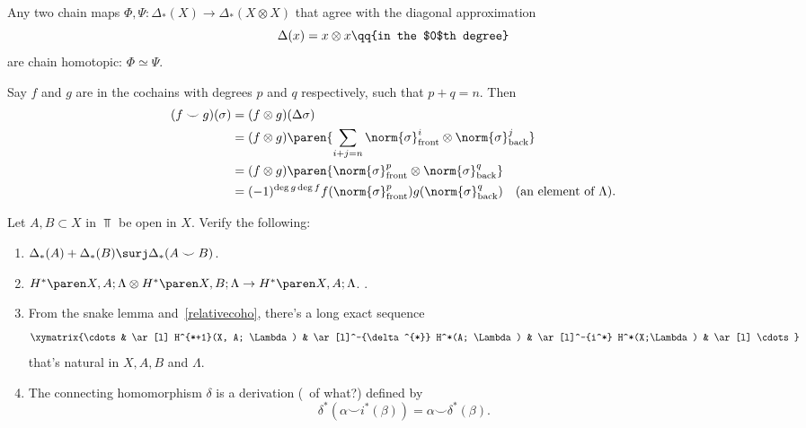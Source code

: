 \begin{todo}
    Any two chain maps $\Phi, \Psi \colon \Delta_*(X) \to \Delta_*(X\otimes X)$ that agree with the diagonal approximation
    \[
        \Delta(x) = x \otimes x \qq{in the $0$th degree}
    \]
    are chain homotopic: $\Phi \simeq \Psi$.
\end{todo}

\begin{prop}
    Say $f$ and $g$ are in the cochains with degrees $p$ and $q$ respectively, such that $p+q = n$. Then
    \begin{align*}
        (f \smile g)(\sigma) &= (f \otimes g)(\Delta\sigma)\\
                           &= (f \otimes g) \paren{\sum_{i+j = n} \norm{ \sigma }_\text{front}^i \otimes \norm{ \sigma }_\text{back}^j} \\
                           &= (f \otimes g) \paren{ \norm{ \sigma }_\text{front}^p \otimes \norm{ \sigma }_\text{back}^q}  \\
                           & = (-1)^{\deg g \deg f} f(  \norm{ \sigma }_\text{front}^p ) g(\norm{ \sigma }_\text{back}^q) \quad (\text{an element of } \Lambda).
    \end{align*}
\end{prop}

\begin{todo}
Let $A, B  \subset X$ in $\Top$ be open in $X$. Verify the following:

\begin{enumerate}
   \item $\Delta_*(A) + \Delta_*(B) \surj \Delta_*(A \smile B)$.
   \item $\coho{X, A}{\Lambda} \otimes \coho{X, B}{\Lambda} \to \coho{X, A}{\Lambda}$. \label{relativecoho}.
    
   \item From the snake lemma and~\eqref{relativecoho}, there's a long exact sequence
        \[
           \xymatrix{\cdots & \ar[l] H^{*+1}(X, A; \Lambda) & \ar[l]^-{\delta^{*}} H^*(A; \Lambda) & \ar[l]^-{i^*} H^*(X;\Lambda) & \ar[l] \cdots}
        \]
        that's natural in $X, A, B$ and $\Lambda$.
        \item The connecting homomorphism $\delta$ is a derivation (\TODO\ of what?) defined by 
        \[
        \delta^*(\alpha \smile i^*(\beta)) = \alpha \smile \delta^*(\beta)
        .\]
\end{enumerate}
\end{todo}
